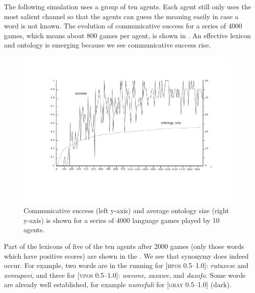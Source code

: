 The following simulation uses a group of ten agents. 
Each agent still only uses the most salient channel so that 
the agents can guess the meaning easily in case a word is not known. 
The evolution of communicative success for a series of 
4000 games, which means about 800 games per agent, 
is shown in . 
An effective lexicon and ontology is 
emerging because we see communicative success rise. 


\begin{figure}[htbp]
  \centerline{\includegraphics[width=\textwidth]{chap6/figs/gsucc2.pdf}}
\caption{\label{gsucc2}Communicative 
success (left y-axis) and average ontology size 
(right y-axis) is shown for a series of 4000
language games played by 10 agents.} 
\end{figure}

Part of the lexicons of five of the ten agents after 2000 games 
(only those words which have positive scores) are shown in the 
. We see that synonymy does indeed occur. For
example, two words are in the 
running for [\textsc{hpos} 0.5–1.0]: \textit{rutaxese} and \textit{xomupovi}, and 
three for [\textsc{vpos} 0.5–1.0]: \textit{wavone}, \textit{zaxawe}, and 
\textit{dazofo}. Some words are already well established, for
example \textit{numefuli} for [\textsc{gray} 0.5–1.0] (dark). 


